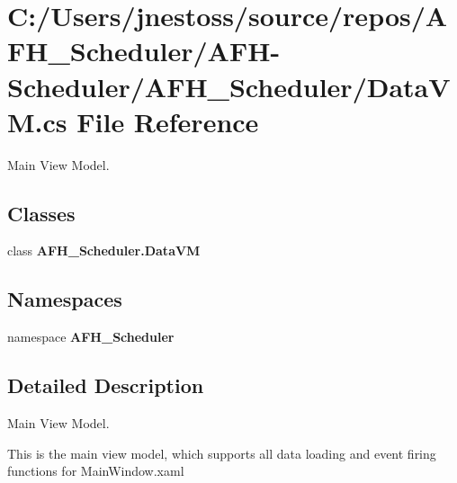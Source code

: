 \section{C\+:/\+Users/jnestoss/source/repos/\+A\+F\+H\+\_\+\+Scheduler/\+A\+F\+H-\/\+Scheduler/\+A\+F\+H\+\_\+\+Scheduler/\+Data\+VM.cs File Reference}
\label{_data_v_m_8cs}


Main View Model.  


\subsection*{Classes}
\begin{DoxyCompactItemize}
\item 
class \textbf{ A\+F\+H\+\_\+\+Scheduler.\+Data\+VM}
\end{DoxyCompactItemize}
\subsection*{Namespaces}
\begin{DoxyCompactItemize}
\item 
namespace \textbf{ A\+F\+H\+\_\+\+Scheduler}
\end{DoxyCompactItemize}


\subsection{Detailed Description}
Main View Model. 

This is the main view model, which supports all data loading and event firing functions for Main\+Window.\+xaml 